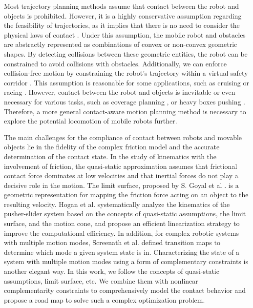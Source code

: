 Most trajectory planning methods assume that contact between the robot and objects is prohibited. However, it is a highly conservative assumption regarding the feasibility of trajectories, as it implies that there is no need to consider the physical laws of contact \cite{wang2022gcopter,tobia2023gcs,jesus2022faster,zhou2019fastplaner}. Under this assumption, the mobile robot and obstacles are abstractly represented as combinations of convex \cite{gilbert1988fast,zhang2021obca} or non-convex \cite{zhang2023continuousSDF} geometric shapes. By detecting collisions between these geometric entities, the robot can be constrained to avoid collisions with obstacles. Additionally, we can enforce collision-free motion by constraining the robot's trajectory within a virtual safety corridor \cite{wang2022gcopter,liu2017quadSFC}. This assumption is reasonable for some applications, such as cruising or racing \cite{song2023racingSC,kaufmann2023racingNature}. However, contact between the robot and objects is inevitable or even necessary for various tasks, such as coverage planning \cite{Galceran2013corveragesurvey}, or heavy boxes pushing \cite{mataric1995cooppushing,ohashi2016realization}. Therefore, a more general contact-aware motion planning method is necessary to explore the potential locomotion of mobile robots further. 

The main challenges for the compliance of contact between robots and movable objects lie in the fidelity of the complex friction model and the accurate determination of the contact state. In the study of kinematics with the involvement of friction, the quasi-static approximation assumes that frictional contact force dominates at low velocities and that inertial forces do not play a decisive role in the motion. %
The limit surface, proposed by S. Goyal et al \cite{goyal1991planar}. is a geometric representation for mapping the friction force acting on an object to the resulting velocity. Hogan et al. \cite{hogan2020feedback} systematically analyze the kinematics of the pusher-slider system based on the concepts of quasi-static assumptions, the limit surface, and the motion cone, and propose an efficient linearization strategy to improve the computational efficiency. In addition, for complex robotic systems with multiple motion modes, Screenath et al. \cite{sreenath2013trajectory} defined transition maps to determine which mode a given system state is in. Characterizing the state of a system with multiple motion modes using a form of complementary constraints is another elegant way. %
In this work, we follow the concepts of quasi-static assumptions, limit surface, etc. We combine them with nonlinear complementarity constraints to comprehensively model the contact behavior and propose a road map to solve such a complex optimization problem.


